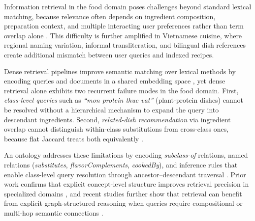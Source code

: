 \label{sec:introduction}

Information retrieval in the food domain poses challenges beyond standard lexical matching, because relevance often depends on ingredient composition, preparation context, and multiple interacting user preferences rather than term overlap alone \cite{robertson2009probabilistic, karpukhin2020dense, zhang2023recipempr, hu2024bridging}. This difficulty is further amplified in Vietnamese cuisine, where regional naming variation, informal transliteration, and bilingual dish references create additional mismatch between user queries and indexed recipes.

Dense retrieval pipelines improve semantic matching over lexical methods by encoding queries and documents in a shared embedding space \cite{karpukhin2020dense, thakur2021beir}, yet dense retrieval alone exhibits two recurrent failure modes in the food domain. First, \emph{class-level queries} such as \textit{``mon protein thuc vat''} (plant-protein dishes) cannot be resolved without a hierarchical mechanism to expand the query into descendant ingredients. Second, \emph{related-dish recommendation} via ingredient overlap cannot distinguish within-class substitutions from cross-class ones, because flat Jaccard treats both equivalently \cite{park2021flavorgraph}.


An ontology addresses these limitations by encoding \emph{subclass-of} relations, named relations (\emph{substitutes}, \emph{flavorComplements}, \emph{cookedBy}), and inference rules that enable class-level query resolution through ancestor--descendant traversal \cite{gruber1993translation, dooley2018foodon}. Prior work confirms that explicit concept-level structure improves retrieval precision in specialized domains \cite{vallet2005ontology, fernandez2011semantic, castells2007adaptation}, and recent studies further show that retrieval can benefit from explicit graph-structured reasoning when queries require compositional or multi-hop semantic connections \cite{he2024g, hipporag2024, kg2rag2025}.


